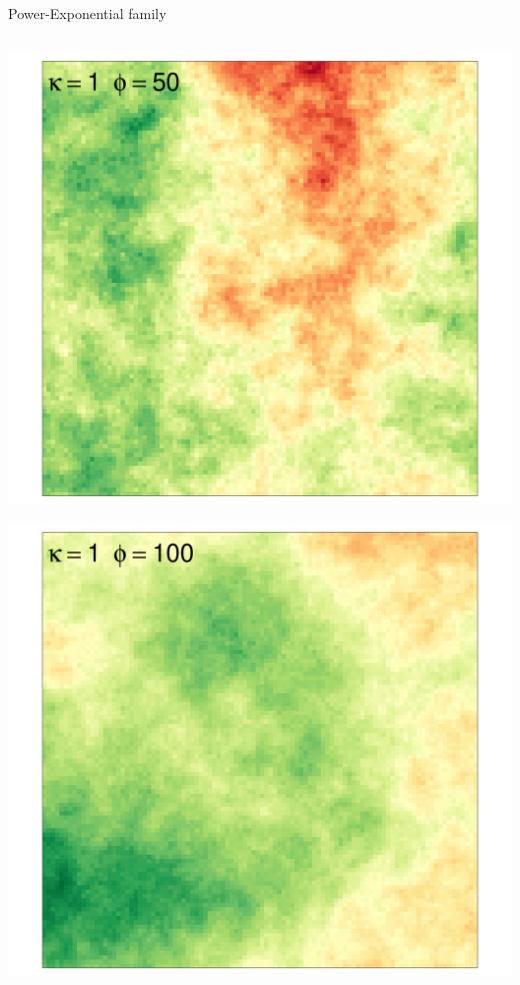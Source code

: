 \documentclass[
  ignorenonframetext,
]{beamer}
\begin{document}
\begin{frame}{Power-Exponential family}
\begin{columns}[T]
\begin{column}{0.33\textwidth}
\includegraphics{Lecture_1_files/figure-beamer/unnamed-chunk-16-1.pdf}

\includegraphics{Lecture_1_files/figure-beamer/unnamed-chunk-17-1.pdf}
\end{column}
\end{columns}
\end{frame}
\end{document}

